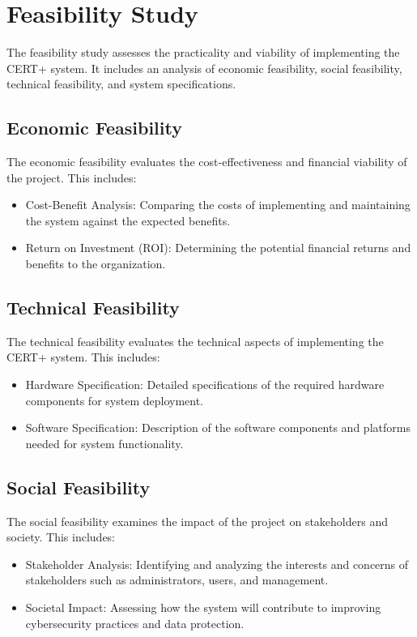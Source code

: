 \documentclass[10pt]{report}
\begin{document}
\section{Feasibility Study}
The feasibility study assesses the practicality and viability of implementing the CERT+ system. It includes an analysis of economic feasibility, social feasibility, technical feasibility, and system specifications.

\subsection{Economic Feasibility}
The economic feasibility evaluates the cost-effectiveness and financial viability of the project. This includes:
\begin{itemize}
    \item Cost-Benefit Analysis: Comparing the costs of implementing and maintaining the system against the expected benefits.
    \item Return on Investment (ROI): Determining the potential financial returns and benefits to the organization.
\end{itemize}


\subsection{Technical Feasibility}
The technical feasibility evaluates the technical aspects of implementing the CERT+ system. This includes:
\begin{itemize}
    \item Hardware Specification: Detailed specifications of the required hardware components for system deployment.
    \item Software Specification: Description of the software components and platforms needed for system functionality.
\end{itemize}

\subsection{Social Feasibility}
The social feasibility examines the impact of the project on stakeholders and society. This includes:
\begin{itemize}
    \item Stakeholder Analysis: Identifying and analyzing the interests and concerns of stakeholders such as administrators, users, and management.
    \item Societal Impact: Assessing how the system will contribute to improving cybersecurity practices and data protection.
\end{itemize}
\end{document}
